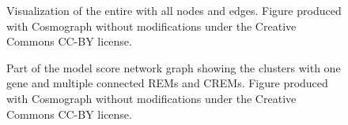 \documentclass[pdftex,12pt,a4paper]{report}
\begin{document}
\begin{figure}[!ht]
\begin{center}
	\caption{Visualization of the entire with all nodes and edges. Figure produced with Cosmograph\cite{cosmograph} without modifications under the Creative Commons CC-BY license.}
	\label{complete_network}
\end{center}
\end{figure}

\begin{figure}[!ht]
\begin{center}
	\caption{Part of the model score network graph showing the clusters with one gene and multiple connected REMs and CREMs. Figure produced with Cosmograph\cite{cosmograph} without modifications under the Creative Commons CC-BY license.}
	\label{network}
\end{center}
\end{figure}
\end{document}
